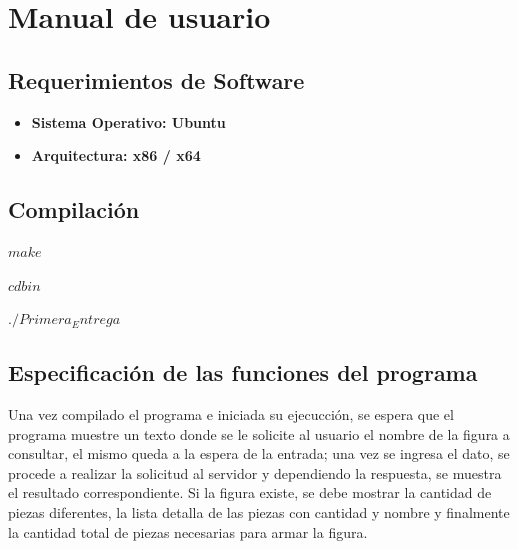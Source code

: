 \documentclass[a4paper,10pt]{article}
\begin{document}
	\newpage
	
	\section{Manual de usuario}
	
	
	\subsection{Requerimientos de Software}
	\begin{itemize}
		\item \textbf{Sistema Operativo: Ubuntu}
		\item \textbf{Arquitectura: x86 / x64 } 
	\end{itemize}
	
	\subsection{Compilación}
	\begin{listing}[style=consola, numbers=none]
	$ make$
	\end{listing}
	\begin{listing}[style=consola, numbers=none]
	$ cd bin$
	\end{listing}
	\begin{listing}[style=consola, numbers=none]
	$ ./Primera_Entrega$
	\end{listing}
	
	
	\subsection{Especificación de las funciones del programa}
    Una vez compilado el programa e iniciada su ejecucción, se espera que el programa muestre un texto donde se le solicite al usuario el nombre de la figura a consultar, el mismo queda a la espera de la entrada; una vez se ingresa el dato, se procede a realizar la solicitud al servidor y dependiendo la respuesta, se muestra el resultado correspondiente.
    Si la figura existe, se debe mostrar la cantidad de piezas diferentes, la lista detalla de las piezas con cantidad y nombre y finalmente la cantidad total de piezas necesarias para armar la figura.
\end{document}
